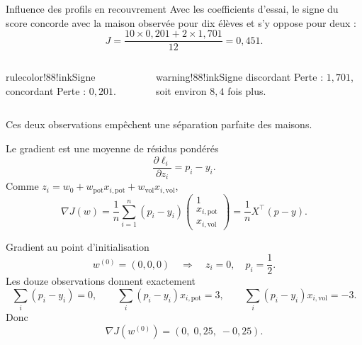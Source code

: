 \begin{frame}[t]{Influence des profils en recouvrement}
  Avec les coefficients d'essai, le signe du score concorde avec la maison
  observée pour dix élèves et s'y oppose pour deux :
  \[
    J=\frac{10\times0{,}201+2\times1{,}701}{12}=0{,}451.
  \]
  \vspace{3mm}
  \begin{columns}[T,onlytextwidth]
      \begin{coursecallout}{rulecolor!88!ink}{Signe concordant}
        Perte : \(0{,}201\).
      \end{coursecallout}
      \begin{coursecallout}{warning!88!ink}{Signe discordant}
        Perte : \(1{,}701\), soit environ \(8{,}4\) fois plus.
      \end{coursecallout}
  \end{columns}
  \vfill
  Ces deux observations empêchent une séparation parfaite des maisons.
\end{frame}


\begin{frame}[t]{Le gradient est une moyenne de résidus pondérés}
  \vspace{4mm}
  \[
    \frac{\partial\ell_i}{\partial z_i}=p_i-y_i.
  \]
  Comme \(z_i=w_0+w_{\mathrm{pot}}x_{i,\mathrm{pot}}
                   +w_{\mathrm{vol}}x_{i,\mathrm{vol}}\),
  \[
  \boxed{
    \nabla J(w)=\frac1n\sum_{i=1}^{n}(p_i-y_i)
      \begin{pmatrix}1\\x_{i,\mathrm{pot}}\\x_{i,\mathrm{vol}}\end{pmatrix}
    =\frac1nX^\top(p-y).}
  \]
\end{frame}

\begin{frame}[t]{Gradient au point d'initialisation}
  \[
    w^{(0)}=(0,0,0)\quad\Longrightarrow\quad z_i=0,
    \quad p_i=\frac12.
  \]
  Les douze observations donnent exactement
  \[
    \sum_i(p_i-y_i)=0,\qquad
    \sum_i(p_i-y_i)x_{i,\mathrm{pot}}=3,\qquad
    \sum_i(p_i-y_i)x_{i,\mathrm{vol}}=-3.
  \]
  Donc
  \[
    \boxed{\nabla J(w^{(0)})=(0,\;0{,}25,\;-0{,}25).}
  \]
\end{frame}

